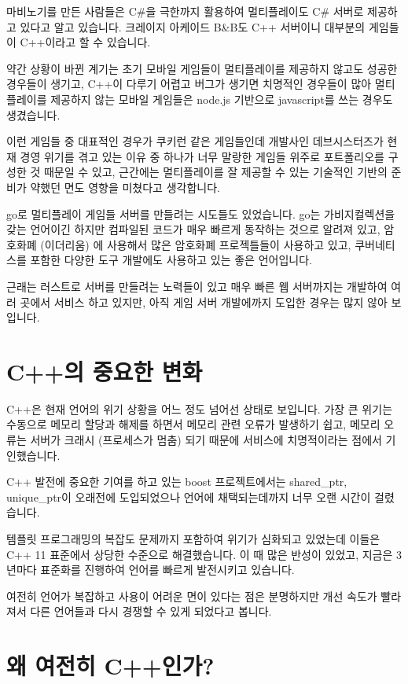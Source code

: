 마비노기를 만든 사람들은 C\#을 극한까지 활용하여 멀티플레이도 C\# 서버로 제공하고 있다고 
알고 있습니다. 크레이지 아케이드 B\&B도 C++ 서버이니 대부분의 게임들이 C++이라고 할 수 있습니다. 

약간 상황이 바뀐 계기는 초기 모바일 게임들이 멀티플레이를 제공하지 않고도 성공한 경우들이 
생기고, C++이 다루기 어렵고 버그가 생기면 치명적인 경우들이 많아 멀티플레이를 제공하지 않는 
모바일 게임들은 node.js 기반으로 javascript를 쓰는 경우도 생겼습니다. 

이런 게임들 중 대표적인 경우가 쿠키런 같은 게임들인데 개발사인 데브시스터즈가 현재 
경영 위기를 겪고 있는 이유 중 하나가 너무 말랑한 게임들 위주로 포트폴리오를 구성한 
것 때문일 수 있고, 근간에는 멀티플레이를 잘 제공할 수 있는 기술적인 기반의 준비가 
약했던 면도 영향을 미쳤다고 생각합니다. 

go로 멀티플레이 게임들 서버를 만들려는 시도들도 있었습니다. go는 가비지컬렉션을 갖는 
언어이긴 하지만 컴파일된 코드가 매우 빠르게 동작하는 것으로 알려져 있고, 암호화폐 (이더리움)
에 사용해서 많은 암호화폐 프로젝틀들이 사용하고 있고, 쿠버네티스를 포함한 다양한 
도구 개발에도 사용하고 있는 좋은 언어입니다. 

근래는 러스트로 서버를 만들려는 노력들이 있고 매우 빠른 웹 서버까지는 개발하여 여러 곳에서 
서비스 하고 있지만, 아직 게임 서버 개발에까지 도입한 경우는 많지 않아 보입니다. 

\section{C++의 중요한 변화}

C++은 현재 언어의 위기 상황을 어느 정도 넘어선 상태로 보입니다. 가장 큰 위기는 수동으로 
메모리 할당과 해제를 하면서 메모리 관련 오류가 발생하기 쉽고, 메모리 오류는 서버가 
크래시 (프로세스가 멈춤) 되기 때문에 서비스에 치명적이라는 점에서 기인했습니다. 

C++ 발전에 중요한 기여를 하고 있는 boost 프로젝트에서는 shared\_ptr, unique\_ptr이 오래전에 
도입되었으나 언어에 채택되는데까지 너무 오랜 시간이 걸렸습니다. 

템플릿 프로그래밍의 복잡도 문제까지 포함하여 위기가 심화되고 있었는데 이들은 C++ 11
표준에서 상당한 수준으로 해결했습니다. 이 때 많은 반성이 있었고, 지금은 3년마다 
표준화를 진행하여 언어를 빠르게 발전시키고 있습니다. 

여전히 언어가 복잡하고 사용이 어려운 면이 있다는 점은 분명하지만 개선 속도가 빨라져서 
다른 언어들과 다시 경쟁할 수 있게 되었다고 봅니다. 

\section{왜 여전히 C++인가?}

